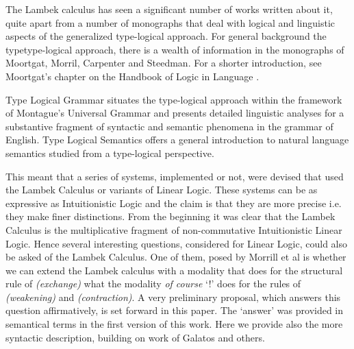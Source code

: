 \documentclass{article}
\begin{document}
The Lambek calculus has seen a significant number of works written about it, quite apart from a number of monographs that deal with logical and linguistic aspects of the generalized type-logical approach.
For  general  background the typetype-logical approach, there is a wealth of information in the monographs of Moortgat, Morril, Carpenter and Steedman. For a shorter introduction, see Moortgat's chapter on the Handbook of Logic in Language \cite{}.

Type Logical Grammar situates the type-logical
approach within the framework of Montague's
Universal Grammar and presents detailed
linguistic analyses
for a substantive fragment of syntactic
and semantic phenomena in the grammar of English.
Type Logical Semantics offers a general
introduction to natural language
semantics studied
from a type-logical
perspective. %



This meant that a series of systems, implemented or not, were devised  that used the Lambek Calculus or variants of Linear Logic. These systems can be   as expressive as Intuitionistic Logic and the claim is that they are more precise i.e. they make finer distinctions.
From the beginning it was clear that the Lambek Calculus is the multiplicative fragment of non-commutative Intuitionistic Linear Logic. 
Hence several interesting questions, considered for Linear Logic,  could also be asked of the Lambek Calculus. 
One of them, posed by Morrill et al  is whether we can extend the Lambek calculus with a modality that does for the structural rule of \textit{(exchange)} what the modality \textit{of course} `!' does for the rules of \textit{(weakening)} and \textit{(contraction)}.
A very preliminary proposal, which answers this question affirmatively, is set forward in this paper. The `answer' was  provided in semantical terms in the first version of this work. Here we provide also the more syntactic description, building on work of Galatos and others.

\end{document}
